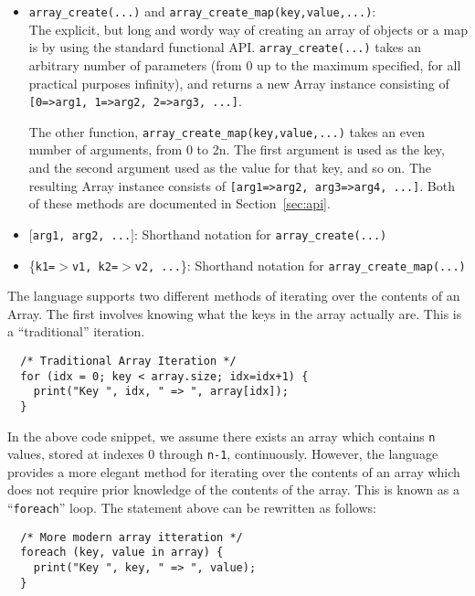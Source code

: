 \begin{itemize}
\item {\tt array\_create(...)} and {\tt array\_create\_map(key,value,...)}:\\
  The explicit, but long and wordy way of creating an array of objects or a map is by using
  the standard functional API. {\tt array\_create(...)} takes an arbitrary number
  of parameters (from 0 up to the maximum specified, for all practical purposes infinity),
  and returns a new Array instance consisting of {\tt [0=>arg1, 1=>arg2, 2=>arg3, ...]}.

  The other function, {\tt array\_create\_map(key,value,...)} takes an even number of
  arguments, from 0 to 2n. The first argument is used as the key, and the second argument
  used as the value for that key, and so on. The resulting Array instance consists
  of {\tt [arg1=>arg2, arg3=>arg4, ...]}. Both of these methods are documented in Section~\ref{sec:api}.
\item {\tt $[$arg1, arg2, ...$]$}: Shorthand notation for {\tt array\_create(...)}
\item \{{\tt k1=$>$v1, k2=$>$v2, ...}\}: Shorthand notation for {\tt array\_create\_map(...)}
\end{itemize}

The \ModLang language supports two different methods of iterating over the
contents of an Array. The first involves knowing what the keys in the array
actually are. This is a ``traditional'' iteration.

\lstset{language=LQX}
\begin{lstlisting}
  /* Traditional Array Iteration */
  for (idx = 0; key < array.size; idx=idx+1) {
    print("Key ", idx, " => ", array[idx]);
  }
\end{lstlisting}

In the above code snippet, we assume there exists an array which contains
{\tt n} values, stored at indexes 0 through {\tt n-1}, continuously. However,
the language provides a more elegant method for iterating over the contents
of an array which does not require prior knowledge of the contents of the array.
This is known as a ``{\tt foreach}'' loop. The statement above can be rewritten
as follows:

\lstset{language=LQX}
\begin{lstlisting}
  /* More modern array itteration */
  foreach (key, value in array) {
    print("Key ", key, " => ", value);
  }
\end{lstlisting}

